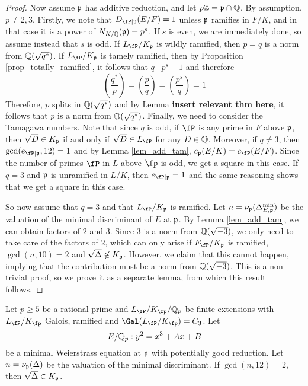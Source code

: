 \begin{proof}
    Now assume $\mathfrak{p}$ has additive reduction, and let $p\mathbb{Z}=\mathfrak{p}\cap\mathbb{Q}$. By assumption, $p\neq2,3$. Firstly, we note that $D_{\fP\mid\pp}(E/F)=1$ unless $\mathfrak{p}$ ramifies in $F/K$, and in that case it is a power of $N_{K/\mathbb{Q}}(\mathfrak{p})=p^s$. If $s$ is even, we are immediately done, so assume instead that $s$ is odd. If $L_\fP/K_\pp$ is wildly ramified, then $p=q$ is a norm from $\mathbb{Q}(\sqrt{q^*})$. If $L_\fP/K_\pp$ is tamely ramified, then by Proposition \ref{prop_totally_ramified}, it follows that $q\mid p^s-1$ and therefore 
    \begin{equation}
        \left(\frac{q^*}{p}\right)=\left(\frac{p}{q}\right)=\left(\frac{p^s}{q}\right)=1
    \end{equation}
    Therefore, $p$ splits in $\mathbb{Q}(\sqrt{q^*})$ and by Lemma \textbf{insert relevant thm here}, it follows that $p$ is a norm from $\mathbb{Q}(\sqrt{q^*})$. 
    Finally, we need to consider the Tamagawa numbers. Note that since $q$ is odd, if $\fP$ is any prime in $F$ above $\mathfrak{p}$, then $\sqrt{D}\in K_{\mathfrak{p}}$ if and only if $\sqrt{D}\in L_\fP$ for any $D\in\mathbb{Q}$. Moreover, if $q\neq 3$, then $\gcd(e_{\fP\mid\pp},12)=1$ and by Lemma \ref{lem_add_tam}, $c_\pp(E/K)=c_\fP(E/F)$. Since the number of primes $\fP$ in $L$ above $\fp$ is odd, we get a square in this case. If $q=3$ and $\mathfrak{p}$ is unramified in $L/K$, then $e_{\fP\mid\pp}=1$ and the same reasoning shows that we get a square in this case. 

    So now assume that $q=3$ and that $L_\fP/K_\pp$ is ramified. Let $n=\nu_{\mathfrak{p}}(\Delta_{E,\mathfrak{p}}^{\min})$ be the valuation of the minimal discriminant of $E$ at $\mathfrak{p}$. By Lemma \ref{lem_add_tam}, we can obtain factors of $2$ and $3$. Since $3$ is a norm from $\mathbb{Q}(\sqrt{-3})$, we only need to take care of the factors of $2$, which can only arise if $F_\fP/K_\pp$ is ramified, $\gcd(n,10)=2$ and $\sqrt{\Delta}\not\in K_{\mathfrak{p}}$. However, we claim that this cannot happen, implying that the contribution must be a norm from $\mathbb{Q}(\sqrt{-3})$. This is a non-trivial proof, so we prove it as a separate lemma, from which this result follows. 
\end{proof}

\begin{lemma}\label{lem_nottwo}
    Let $p\geq 5$ be a rational prime and $L_\fP/K_\fp/\QQ_p$ be finite extensions with $L_\fP/K_\fp$ Galois, ramified and $\Gal(L_\fP/K_\fp)=C_3$. Let $$E/\mathbb{Q}_p:y^2=x^3+Ax+B$$ be a minimal Weierstrass equation at $\mathfrak{p}$ with potentially good reduction. Let $n=\nu_{\mathfrak{p}}(\Delta)$ be the valuation of the minimal discriminant. If $\gcd(n,12)=2$, then $\sqrt{\Delta}\in K_{\mathfrak{p}}$.
\end{lemma}

